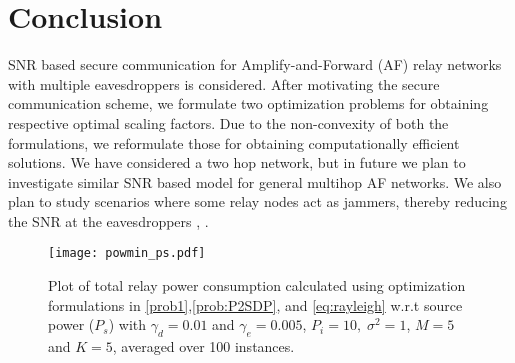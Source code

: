 \documentclass[journal,,draftclsnofoot letterpaper, onecolumn]{IEEEtran}
\begin{document}
\section{Conclusion}
\label{sec:concl}
SNR based secure communication for Amplify-and-Forward (AF) relay networks with multiple eavesdroppers is considered. After motivating the secure communication scheme, we formulate two optimization problems for obtaining respective optimal scaling factors. Due to the non-convexity of both the formulations, we reformulate those for obtaining computationally efficient solutions. We have considered a two hop network, but in future we plan to investigate similar SNR based model for general multihop AF networks. We also plan to study scenarios where some relay nodes act as jammers, thereby reducing the SNR at the eavesdroppers \cite{sarma}, \cite{sankararaman2012}.

\begin{figure}[!t]
\centering
\texttt{[image: powmin\_ps.pdf]}
\caption{Plot of total relay power consumption calculated using optimization formulations in \eqref{prob1},\eqref{prob:P2SDP}, and \eqref{eq:rayleigh} w.r.t source power ($P_s$) with $\gamma_d=0.01$ and $\gamma_e=0.005$, $P_i=10,\;\sigma^2=1$, $M=5$ and $K=5$, averaged over 100 instances.}
\label{fig_powmin}
\end{figure}
\end{document}
